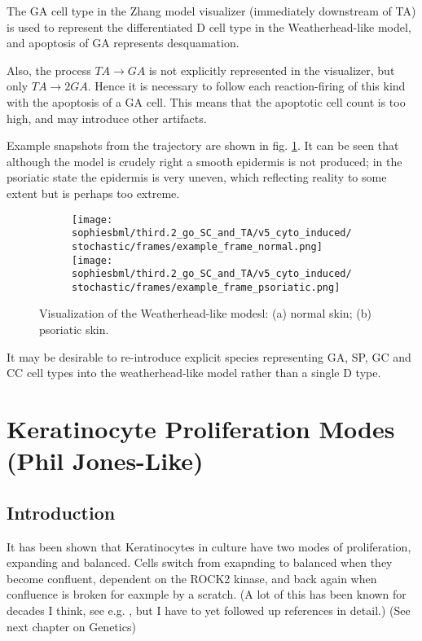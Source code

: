 \documentclass[a4paper,10pt]{report}
\newcommand{\psortbase}{/home/ngrs2/work/bsu/PSORT_Zuliani_Reynolds/}
\newcommand{\sbmlbase}{\psortbase/sbml-sh/}
\newcommand{\sophiesbml}{\sbmlbase/sophie_like}
\begin{document}
The GA cell type in the Zhang model visualizer (immediately downstream of TA) is used to represent the differentiated D cell type in the Weatherhead-like model, and apoptosis of GA represents desquamation.

Also, the process $TA \rightarrow GA$ is not explicitly represented in the visualizer,  but only $TA \rightarrow 2 GA$. Hence it is necessary to follow each reaction-firing of this kind with the apoptosis of a GA cell. This means that the apoptotic cell count is too high, and may introduce other artifacts. 

Example snapshots from the trajectory are shown in fig. \ref{fig:visu_thirdpointtwosophie_cytostim}. It can be seen that although the model is crudely right a smooth epidermis is not produced; in the psoriatic state the epidermis is very uneven, which reflecting reality to some extent but is perhaps too extreme. 


\begin{figure}[h!]
  \begin{subfigure}{\textwidth}
    \texttt{[image: \\sophiesbml/third.2\_go\_SC\_and\_TA/v5\_cyto\_induced/stochastic/frames/example\_frame\_normal.png]}
    \texttt{[image: \\sophiesbml/third.2\_go\_SC\_and\_TA/v5\_cyto\_induced/stochastic/frames/example\_frame\_psoriatic.png]}
  \end{subfigure}
  \caption{Visualization of the Weatherhead-like modesl: (a) normal skin; (b) psoriatic skin.}
  \label{fig:visu_thirdpointtwosophie_cytostim}
\end{figure}

It may be desirable to re-introduce explicit species representing GA, SP, GC and CC cell types into the weatherhead-like model rather than a single D type. 



\chapter{Keratinocyte Proliferation Modes (Phil Jones-Like)}\label{chapter-philjones}

\section{Introduction}
It has been shown \cite{roshan2016human} that Keratinocytes in culture have two modes of proliferation, expanding and balanced. Cells switch from exapnding to balanced when they become confluent, dependent on the ROCK2 kinase,  and back again when confluence is broken for eaxmple by a scratch. (A lot of this has been known for decades I think, see e.g. \cite{barrandon1987cell}, but I have to yet followed up references in detail.) (See next chapter on Genetics) 
\end{document}
